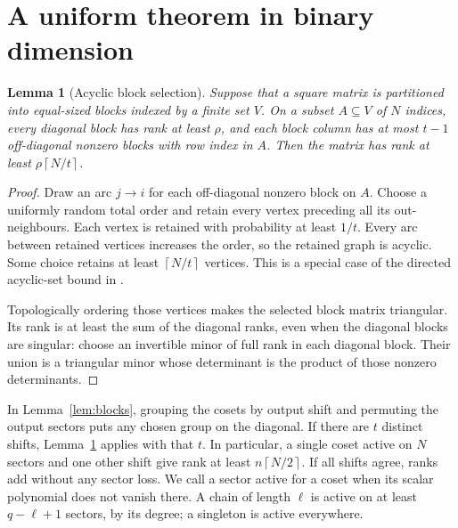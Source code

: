 \documentclass[11pt,a4paper]{article}
\newtheorem{lemma}[theorem]{Lemma}
\theoremstyle{remark}\newtheorem{remark}[theorem]{Remark}
\newcommand{\ceil}[1]{\left\lceil #1\right\rceil}
\begin{document}
\section{A uniform theorem in binary dimension}
\begin{lemma}[Acyclic block selection]\label{lem:acyclic}
Suppose that a square matrix is partitioned into equal-sized blocks indexed by a finite set $V$. On a subset $A\subseteq V$ of $N$ indices, every diagonal block has rank at least $\rho$, and each block column has at most $t-1$ off-diagonal nonzero blocks with row index in $A$. Then the matrix has rank at least $\rho\ceil{N/t}$.
\end{lemma}
\begin{proof}
Draw an arc $j\to i$ for each off-diagonal nonzero block on $A$. Choose a uniformly random total order and retain every vertex preceding all its out-neighbours. Each vertex is retained with probability at least $1/t$. Every arc between retained vertices increases the order, so the retained graph is acyclic. Some choice retains at least $\ceil{N/t}$ vertices. This is a special case of the directed acyclic-set bound in \cite[Theorem 4]{gruber}.

Topologically ordering those vertices makes the selected block matrix triangular. Its rank is at least the sum of the diagonal ranks, even when the diagonal blocks are singular: choose an invertible minor of full rank in each diagonal block. Their union is a triangular minor whose determinant is the product of those nonzero determinants.
\end{proof}

In Lemma~\ref{lem:blocks}, grouping the cosets by output shift and permuting the output sectors puts any chosen group on the diagonal. If there are $t$ distinct shifts, Lemma~\ref{lem:acyclic} applies with that $t$. In particular, a single coset active on $N$ sectors and one other shift give rank at least $n\ceil{N/2}$. If all shifts agree, ranks add without any sector loss. We call a sector active for a coset when its scalar polynomial does not vanish there. A chain of length $\ell$ is active on at least $q-\ell+1$ sectors, by its degree; a singleton is active everywhere.
\end{document}
